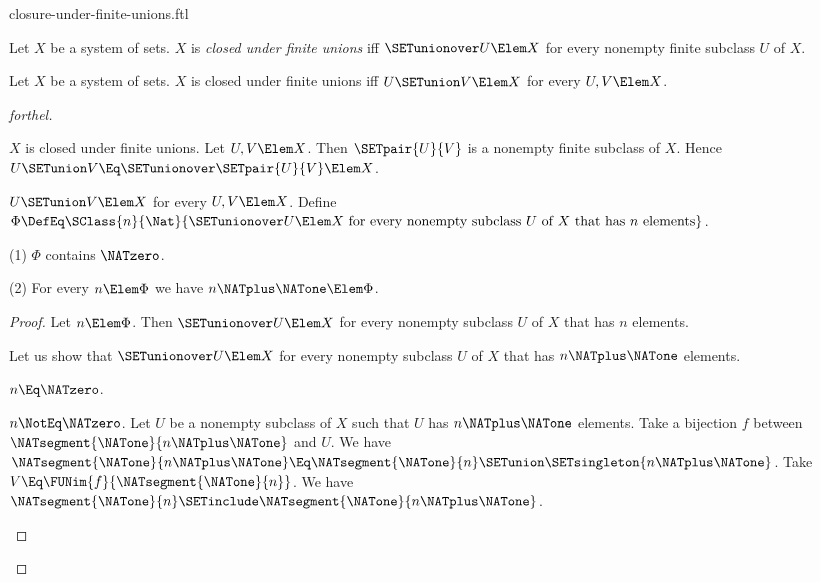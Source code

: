 \documentclass{stex}
\begin{document}
\begin{smodule}{closure-under-finite-unions.ftl}

\begin{definition}[forthel,for=closed under finite unions]
  Let $X$ be a system of sets.
  $X$ is \emph{closed under finite unions} iff $\SETunionover U \Elem X$ for every nonempty finite subclass $U$ of $X$.
\end{definition}

\begin{proposition}[forthel]
  Let $X$ be a system of sets.
  $X$ is closed under finite unions iff $U \SETunion V \Elem X$ for every $U, V \Elem X$.
\end{proposition}
\begin{proof}[forthel]
  \begin{case}{$X$ is closed under finite unions.}
    Let $U, V \Elem X$.
    Then $\SETpair{U}{V}$ is a nonempty finite subclass of $X$.
    Hence $U \SETunion V \Eq \SETunionover \SETpair{U}{V} \Elem X$.
  \end{case}

  \begin{case}{$U \SETunion V \Elem X$ for every $U, V \Elem X$.}
    Define $\Phi \DefEq \SClass{n}{\Nat}{\SETunionover U \Elem X\text{ for every nonempty subclass }U\text{ of }X\text{ that has }n\text{ elements}}$.

    (1) $\Phi$ contains $\NATzero$.

    (2) For every $n \Elem \Phi$ we have $n \NATplus \NATone \Elem \Phi$.
    \begin{proof}
      Let $n \Elem \Phi$.
      Then $\SETunionover U \Elem X$ for every nonempty subclass $U$ of $X$ that has $n$ elements.

      Let us show that $\SETunionover U \Elem X$ for every nonempty subclass $U$ of $X$ that has $n \NATplus \NATone$ elements.

        \begin{case}{$n \Eq \NATzero$.} \end{case}

        \begin{case}{$n \NotEq \NATzero$.}
          Let $U$ be a nonempty subclass of $X$ such that $U$ has $n \NATplus \NATone$ elements.
          Take a bijection $f$ between $\NATsegment{\NATone}{n \NATplus \NATone}$ and $U$.
          We have $\NATsegment{\NATone}{n \NATplus \NATone} \Eq \NATsegment{\NATone}{n} \SETunion \SETsingleton{n \NATplus \NATone}$.
          Take $V \Eq \FUNim{f}{\NATsegment{\NATone}{n}}$.
          We have $\NATsegment{\NATone}{n} \SETinclude \NATsegment{\NATone}{n \NATplus \NATone}$.


\end{case}
\end{proof}
\end{case}
\end{proof}
\end{smodule}
\end{document}
